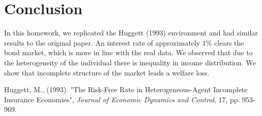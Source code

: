\documentclass[a4paper,10pt,12pt]{article}%
\begin{document}
\section*{Conclusion}
In this homework, we replicated the Huggett (1993) environment and had similar results to the original paper. An interest rate of approximately $1\%$ clears the bond market, which is more in line with the real data. We observed that due to the heterogeneity of the individual there is inequality in income distribution. We show that incomplete structure of the market leads a welfare loss. 

\newpage
\begin{thebibliography}{9}

Huggett, M., (1993). "The Risk-Free Rate in Heterogeneous-Agent Incomplete Insurance
Economies", \emph{Journal of Economic Dynamics and Control}, 17, pp. 953-969.

\end{thebibliography}
\end{document}
